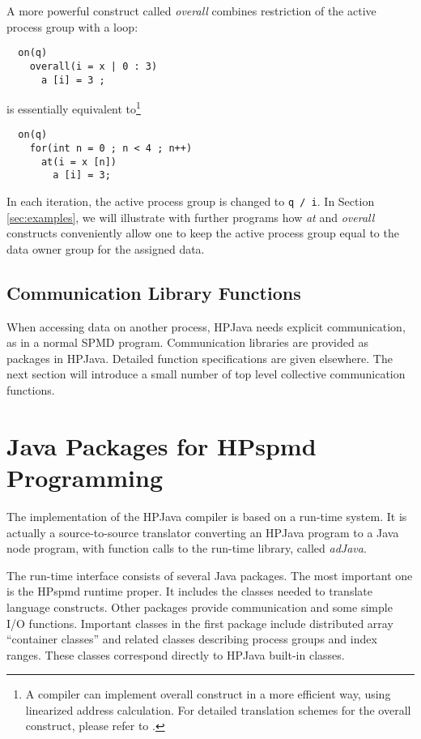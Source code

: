 A more powerful construct called {\em overall}
combines restriction of the active process group with a loop:
\small
\begin{verbatim}
  on(q)
    overall(i = x | 0 : 3)
      a [i] = 3 ;
\end{verbatim}
\normalsize
is essentially equivalent to\footnote{A compiler can implement
overall construct in a more efficient way, using linearized
address calculation.  For detailed translation schemes for the
overall construct, please refer to \cite{Car98}.}
\small
\begin{verbatim}
  on(q) 
    for(int n = 0 ; n < 4 ; n++)
      at(i = x [n])
        a [i] = 3;
\end{verbatim}
\normalsize
In each iteration, the active process group is changed to \texttt{q /
i}.  In Section \ref{sec:examples}, we will illustrate with further
programs how {\em at} and {\em overall} constructs conveniently
allow one to keep the active process group equal to the data owner
group for the assigned data.

\subsection{Communication Library Functions}
\label{communication}

When accessing data on another process, HPJava needs explicit
communication, as in a normal SPMD program. 
Communication libraries are provided as packages in HPJava. Detailed
function specifications are given elsewhere.  The next
section will introduce a small number of top level collective
communication functions.


\section{Java Packages for HPspmd Programming}
\label{sec:package}

The implementation of the HPJava compiler is based on a run-time system.
It is actually a source-to-source translator converting an HPJava
program to a Java node program, with function calls to the run-time
library, called \emph{adJava}.

The run-time interface consists of several Java packages. The most
important one is the HPspmd runtime proper.  It includes the classes
needed to translate language constructs.  Other packages provide
communication and some simple I/O functions.  Important classes in the
first package include distributed array ``container classes'' and
related classes describing process groups and index ranges.  These
classes correspond directly to HPJava built-in classes.


